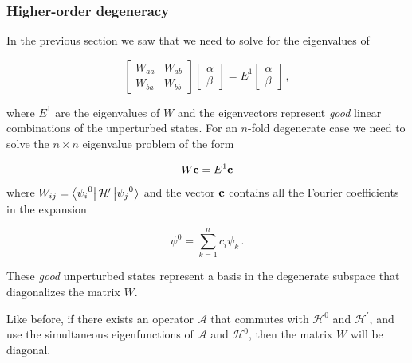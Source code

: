 \documentclass[12pt, titlepage]{article}
\begin{document}
\subsubsection{Higher-order degeneracy}
In the previous section we saw that we need to solve for the eigenvalues of 

\begin{equation*}
\begin{bmatrix}
W_{aa} & W_{ab} \\ W_{ba} & W_{bb}
\end{bmatrix}
\begin{bmatrix}
\alpha \\ \beta
\end{bmatrix}
= E^1
\begin{bmatrix}
\alpha \\ \beta
\end{bmatrix} \,,
\end{equation*}

where $E^1$ are the eigenvalues of $W$ and the eigenvectors represent \textit{good} linear combinations of the unperturbed states. For an $n$-fold degenerate case we need to solve the $n \times n$ eigenvalue problem of the form

\begin{equation}
	W\vb{c} = E^1\vb{c}
\end{equation}

where $W_{ij} = \bra{{\psi_i}^0}\mathcal{H}^\prime\ket{{\psi_j}^0}$ and the vector $\vb{c}$ contains all the Fourier coefficients in the expansion

\begin{equation*}
	\psi^0 = \sum_{k=1}^{n}c_i\psi_k \,.
\end{equation*}

These \textit{good} unperturbed states represent a basis in the degenerate subspace that diagonalizes the matrix $W$. 

Like before, if there exists an operator $\mathcal{A}$ that commutes with $\mathcal{H}^0$ and $\mathcal{H}^\prime$, and use the simultaneous eigenfunctions of $\mathcal{A}$ and $\mathcal{H}^0$, then the matrix $W$ will be diagonal.
\end{document}
